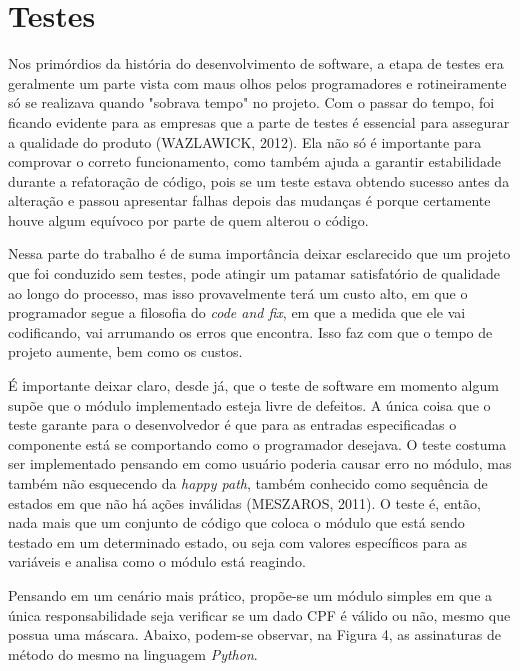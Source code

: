 \documentclass[
    12pt,       %
    openright,      %
    twoside,      %
    a4paper,      %
    english,      %
    french,       %
    spanish,      %
    brazil,       %
    ]{abntex2}
\begin{document}
  \chapter{Testes}
      Nos primórdios da história do desenvolvimento de software, a etapa de testes
      era geralmente um parte vista com maus olhos pelos programadores e rotineiramente
      só se realizava quando "sobrava tempo" no projeto. Com o passar do tempo, foi
      ficando evidente para as empresas que a parte de testes é essencial para
      assegurar a qualidade do produto (WAZLAWICK, 2012). Ela não só é importante
      para comprovar o correto funcionamento, como também ajuda a garantir
      estabilidade durante a refatoração de código, pois se um teste estava obtendo
      sucesso antes da alteração e passou apresentar falhas depois das mudanças é
      porque certamente houve algum equívoco por parte de quem alterou o código.

      Nessa parte do trabalho é de suma importância deixar esclarecido
      que um projeto que foi conduzido sem testes, pode atingir um patamar
      satisfatório de qualidade ao longo do processo, mas isso provavelmente terá um
      custo alto, em que o programador segue a filosofia do \textit{code and fix},
      em que a medida que ele vai codificando, vai arrumando os erros que encontra.
      Isso faz com que o tempo de projeto aumente, bem como os custos.

      É importante deixar claro, desde já, que o teste de software em momento
      algum supõe que o módulo implementado esteja livre de defeitos. A única coisa que o
      teste garante para o desenvolvedor é que para as entradas especificadas o
      componente está se comportando como o programador desejava. O teste costuma
      ser implementado pensando em como usuário poderia causar erro no módulo, mas
      também não esquecendo da \textit{happy path}, também conhecido como sequência
      de estados em que não há ações inválidas (MESZAROS, 2011). O teste é, então,
      nada mais que um conjunto de código que coloca o módulo que está sendo testado
      em um determinado estado, ou seja com valores específicos para as variáveis e
      analisa como o módulo está reagindo.

      Pensando em um cenário mais prático, propõe-se um módulo simples em que a única
      responsabilidade seja verificar se um dado CPF é válido ou não, mesmo que possua uma
      máscara. Abaixo, podem-se observar, na Figura 4, as assinaturas de método do
      mesmo na linguagem
      \textit{Python}.
\end{document}
